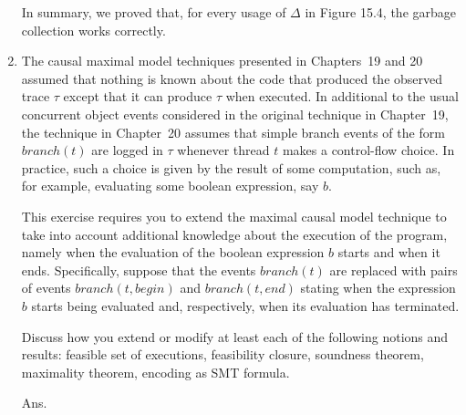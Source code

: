 \documentclass{article}
\begin{document}
\begin{enumerate}
In summary, we proved that, for every usage of $\Delta$ in Figure 15.4,
the garbage collection works correctly.

\item The causal maximal model techniques presented in Chapters~19 and 20 assumed
that nothing is known about the code that produced the observed trace $\tau$
except that it can produce $\tau$ when executed.
In additional to the usual concurrent object events considered in the original
technique in Chapter~19,
the technique in Chapter~20 assumes that simple branch events of the form 
$branch(t)$ are logged in $\tau$ whenever thread $t$ makes a control-flow choice.
 In practice, such a choice is given by the result of some computation,
such as, for example, evaluating some boolean expression, say $b$.

This exercise requires you to extend the maximal causal model technique to take
into account additional knowledge about the execution of the program,
namely when the evaluation of the boolean expression $b$ starts and when it ends.
Specifically, suppose that the events $branch(t)$ are replaced with pairs of
events $branch(t, begin)$ and $branch(t,end)$ stating when the expression $b$
starts being evaluated and, respectively, when its evaluation has terminated.

Discuss how you extend or modify at least each of the following notions and
results: feasible set of executions, feasibility closure, soundness theorem,
maximality theorem, encoding as SMT formula.

\newcommand{\Rest}{\ensuremath{\upharpoonright}}
\newcommand{\F}{\ensuremath{\mathcal{F}}}
Ans.


\end{enumerate}
\end{document}
